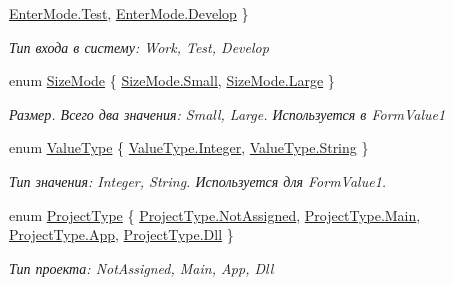 \begin{DoxyCompactItemize}
\mbox{\hyperlink{namespace_f_b_a_ae06257c0c200c35284fec536bf589744a0cbc6611f5540bd0809a388dc95a615b}{Enter\+Mode.\+Test}}, 
\mbox{\hyperlink{namespace_f_b_a_ae06257c0c200c35284fec536bf589744a1bedc6fb14c15b2e99872ebdbc317bf2}{Enter\+Mode.\+Develop}}
 \}
\begin{DoxyCompactList}\small\item\em Тип входа в систему\+: Work, Test, Develop \end{DoxyCompactList}\item 
enum \mbox{\hyperlink{namespace_f_b_a_a31f4a0fbaafbf41e35e4589c7f489675}{Size\+Mode}} \{ \mbox{\hyperlink{namespace_f_b_a_a31f4a0fbaafbf41e35e4589c7f489675a2660064e68655415da2628c2ae2f7592}{Size\+Mode.\+Small}}, 
\mbox{\hyperlink{namespace_f_b_a_a31f4a0fbaafbf41e35e4589c7f489675a3a69b34ce86dacb205936a8094f6c743}{Size\+Mode.\+Large}}
 \}
\begin{DoxyCompactList}\small\item\em Размер. Всего два значения\+: Small, Large. Используется в Form\+Value1 \end{DoxyCompactList}\item 
enum \mbox{\hyperlink{namespace_f_b_a_a940b390561ecfbdb6e1606ec1711bd59}{Value\+Type}} \{ \mbox{\hyperlink{namespace_f_b_a_a940b390561ecfbdb6e1606ec1711bd59aa0faef0851b4294c06f2b94bb1cb2044}{Value\+Type.\+Integer}}, 
\mbox{\hyperlink{namespace_f_b_a_a940b390561ecfbdb6e1606ec1711bd59a27118326006d3829667a400ad23d5d98}{Value\+Type.\+String}}
 \}
\begin{DoxyCompactList}\small\item\em Тип значения\+: Integer, String. Используется для Form\+Value1. \end{DoxyCompactList}\item 
enum \mbox{\hyperlink{namespace_f_b_a_a56f575149e60be6beeedc93ec1f6a0ef}{Project\+Type}} \{ \mbox{\hyperlink{namespace_f_b_a_a56f575149e60be6beeedc93ec1f6a0efa316d54b418d9a7186f9234f08cfb599f}{Project\+Type.\+Not\+Assigned}}, 
\mbox{\hyperlink{namespace_f_b_a_a56f575149e60be6beeedc93ec1f6a0efaa02c83a7dbd96295beaefb72c2bee2de}{Project\+Type.\+Main}}, 
\mbox{\hyperlink{namespace_f_b_a_a56f575149e60be6beeedc93ec1f6a0efaac863f346e618f9a959b5c95d5d28941}{Project\+Type.\+App}}, 
\mbox{\hyperlink{namespace_f_b_a_a56f575149e60be6beeedc93ec1f6a0efacae35aa858bf0981840ab6826b3e9ed0}{Project\+Type.\+Dll}}
 \}
\begin{DoxyCompactList}\small\item\em Тип проекта\+: Not\+Assigned, Main, App, Dll \end{DoxyCompactList}\end{DoxyCompactItemize}
